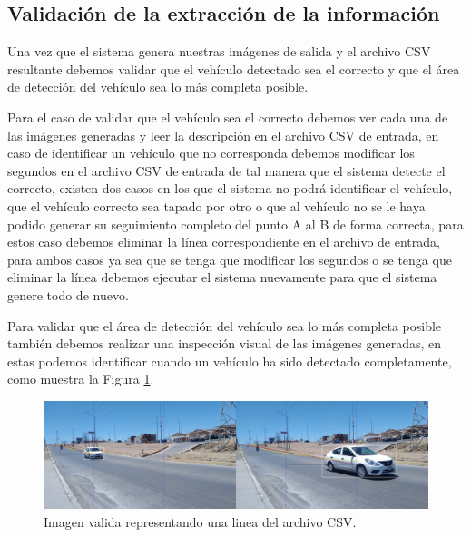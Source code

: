 
\subsection{Validación de la extracción de la información}

Una vez que el sistema genera nuestras imágenes de salida y el archivo CSV resultante debemos validar que el vehículo detectado sea el correcto y que el área de detección del vehículo sea lo más completa posible.

Para el caso de validar que el vehículo sea el correcto debemos ver cada una de las imágenes generadas y leer la descripción en el archivo CSV de entrada, en caso de identificar un vehículo que no corresponda debemos modificar los segundos en el archivo CSV de entrada de tal manera que el sistema detecte el correcto, existen dos casos en los que el sistema no podrá identificar el vehículo, que el vehículo correcto sea tapado por otro o que al vehículo no se le haya podido generar su seguimiento completo del punto A al B de forma correcta, para estos caso debemos eliminar la línea correspondiente en el archivo de entrada, para ambos casos ya sea que se tenga que modificar los segundos o se tenga que eliminar la línea debemos ejecutar el sistema nuevamente para que el sistema genere todo de nuevo.

Para validar que el área de detección del vehículo sea lo más completa posible también debemos realizar una inspección visual de las imágenes generadas, en estas podemos identificar cuando un vehículo ha sido detectado completamente, como muestra la Figura \ref{fig:ImagenValida}.

\begin{figure}[H]
    \centering
    \includegraphics[width=1\textwidth]{Metodologia/imgs/Valido.jpg}
    \caption{Imagen valida representando una linea del archivo CSV.}
    \label{fig:ImagenValida}
\end{figure}


